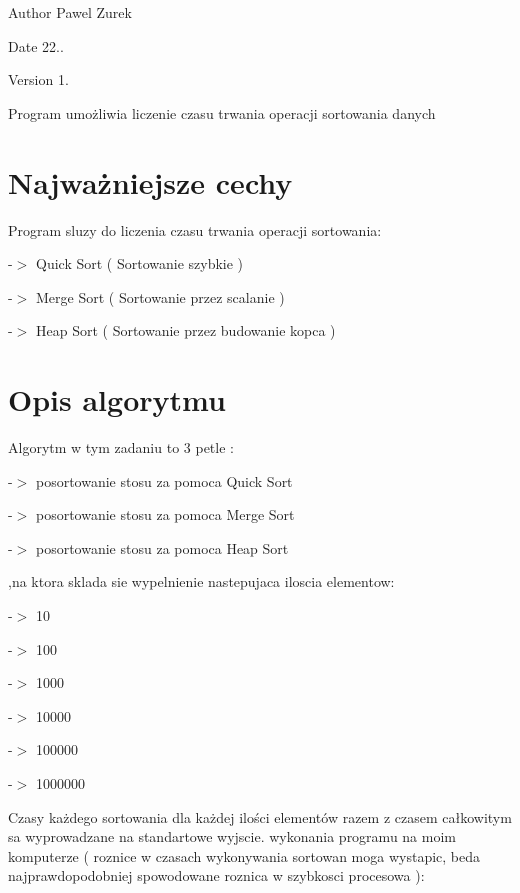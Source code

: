 \begin{DoxyAuthor}{Author}
Pawel Zurek 
\end{DoxyAuthor}
\begin{DoxyDate}{Date}
22.. 
\end{DoxyDate}
\begin{DoxyVersion}{Version}
1.
\end{DoxyVersion}
Program umożliwia liczenie czasu trwania operacji sortowania danych\hypertarget{index_etykieta-wazne-cechy}{}\section{Najważniejsze cechy}\label{index_etykieta-wazne-cechy}
Program sluzy do liczenia czasu trwania operacji sortowania\-:\par


\par
-\/$>$ Quick Sort ( Sortowanie szybkie ) \par
-\/$>$ Merge Sort ( Sortowanie przez scalanie ) \par
-\/$>$ Heap Sort ( Sortowanie przez budowanie kopca )\hypertarget{index_etykieta-op-algorytm}{}\section{Opis algorytmu}\label{index_etykieta-op-algorytm}
Algorytm w tym zadaniu to 3 petle \-: \par
-\/$>$ posortowanie stosu za pomoca Quick Sort \par
-\/$>$ posortowanie stosu za pomoca Merge Sort \par
-\/$>$ posortowanie stosu za pomoca Heap Sort

\par
,na ktora sklada sie wypelnienie nastepujaca iloscia elementow\-:

\par
-\/$>$ 10 \par
-\/$>$ 100 \par
-\/$>$ 1000 \par
-\/$>$ 10000 \par
-\/$>$ 100000 \par
-\/$>$ 1000000

Czasy każdego sortowania dla każdej ilości elementów razem z czasem całkowitym sa wyprowadzane na standartowe wyjscie.  wykonania programu na moim komputerze ( roznice w czasach wykonywania sortowan moga wystapic, beda najprawdopodobniej spowodowane roznica w szybkosci procesowa )\-:

